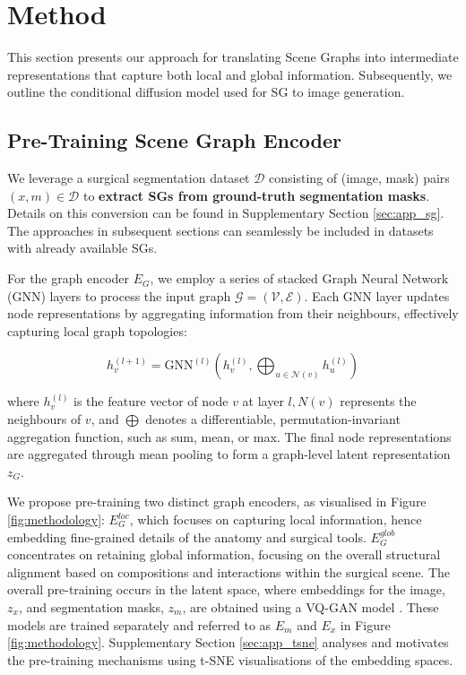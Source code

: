 \section{Method}
\label{sec:meth}

This section presents our approach for translating Scene Graphs into intermediate representations that capture both local and global information. Subsequently, we outline the conditional diffusion model used for SG to image generation.

\subsection{Pre-Training Scene Graph Encoder}
We leverage a surgical segmentation dataset $\mathcal{D}$ consisting of (image, mask) pairs $(x, m) \in \mathcal{D}$ to \textbf{extract SGs from ground-truth segmentation masks}. Details on this conversion can be found in Supplementary Section \ref{sec:app_sg}. The approaches in subsequent sections can seamlessly be included in datasets with already available SGs.

For the graph encoder $E_G$, we employ a series of stacked Graph Neural Network (GNN) layers \cite{wu2020comprehensive} to process the input graph $\mathcal{G} = (\mathcal{V},\mathcal{E})$. Each GNN layer updates node representations by aggregating information from their neighbours, effectively capturing local graph topologies:

\begin{equation}
    h_v^{(l+1)} = \text{GNN}^{(l)}(h_v^{(l)}, \bigoplus_{u \in \mathcal{N}(v)} h_u^{(l)})
\end{equation}

where $h_v^{(l)}$ is the feature vector of node $v$ at layer $l, N(v)$ represents the neighbours of $v$, and $\bigoplus$ denotes a differentiable, permutation-invariant aggregation function, such as sum, mean, or max. The final node representations are aggregated through mean pooling to form a graph-level latent representation $z_G$. 

We propose pre-training two distinct graph encoders, as visualised in Figure \ref{fig:methodology}: $E_G^{loc}$, which focuses on capturing local information, hence embedding fine-grained details of the anatomy and surgical tools. $E_G^{glob}$ concentrates on retaining global information, focusing on the overall structural alignment based on compositions and interactions within the surgical scene. The overall pre-training occurs in the latent space, where embeddings for the image, $z_x$, and segmentation masks, $z_m$, are obtained using a VQ-GAN model \cite{esser2020taming}. These models are trained separately and referred to as $E_m$ and $E_x$ in Figure \ref{fig:methodology}. Supplementary Section \ref{sec:app_tsne} analyses and motivates the pre-training mechanisms using t-SNE visualisations of the embedding spaces.


